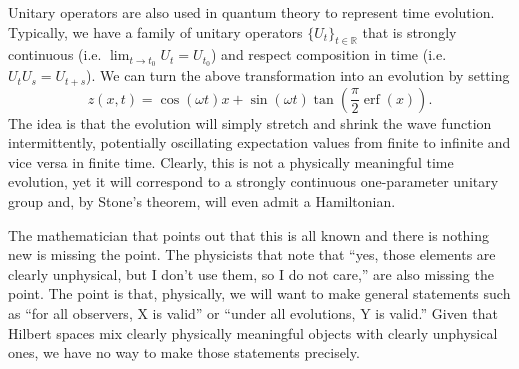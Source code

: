 \documentclass[10pt,twocolumn, nofootinbib]{revtex4-2}
\DeclareMathOperator{\erf}{erf}
\begin{document}
Unitary operators are also used in quantum theory to represent time evolution. Typically, we have a family of unitary operators $\{U_t\}_{t \in \mathbb{R}}$ that is strongly continuous (i.e. $\lim_{t \to t_0} U_t = U_{t_0}$) and respect composition in time (i.e. $U_t U_s = U_{t+s}$). We can turn the above transformation into an evolution by setting
\begin{equation}
z(x, t) = \cos(\omega t) x + \sin(\omega t) \tan \left(\frac{\pi}{2}\erf(x)\right).
\end{equation}
The idea is that the evolution will simply stretch and shrink the wave function intermittently, potentially oscillating expectation values from finite to infinite and vice versa in finite time. Clearly, this is not a physically meaningful time evolution, yet it will correspond to a strongly continuous one-parameter unitary group and, by Stone's theorem, will even admit a Hamiltonian.

The mathematician that points out that this is all known and there is nothing new is missing the point. The physicists that note that ``yes, those elements are clearly unphysical, but I don't use them, so I do not care,'' are also missing the point. The point is that, physically, we will want to make general statements such as ``for all observers, X is valid'' or ``under all evolutions, Y is valid.'' Given that Hilbert spaces mix clearly physically meaningful objects with clearly unphysical ones, we have no way to make those statements precisely.
\end{document}
